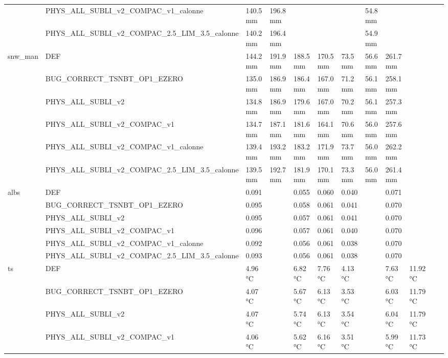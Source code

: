 \begin{tabular}{llllllllllll}
 & PHYS_ALL_SUBLI_v2_COMPAC_v1_calonne & 140.5 mm & 196.8 mm &  &  &  & 54.8 mm &  &  &  &  \\
 & PHYS_ALL_SUBLI_v2_COMPAC_2.5_LIM_3.5_calonne & 140.2 mm & 196.4 mm &  &  &  & 54.9 mm &  &  &  &  \\
\cline{1-12}
\multirow[t]{6}{*}{snw_man} & DEF & 144.2 mm & 191.9 mm & 188.5 mm & 170.5 mm & 73.5 mm & 56.6 mm & 261.7 mm &  &  &  \\
 & BUG_CORRECT_TSNBT_OP1_EZERO & 135.0 mm & 186.9 mm & 186.4 mm & 167.0 mm & 71.2 mm & 56.1 mm & 258.1 mm &  &  &  \\
 & PHYS_ALL_SUBLI_v2 & 134.8 mm & 186.9 mm & 179.6 mm & 167.0 mm & 70.2 mm & 56.1 mm & 257.3 mm &  &  &  \\
 & PHYS_ALL_SUBLI_v2_COMPAC_v1 & 134.7 mm & 187.1 mm & 181.6 mm & 164.1 mm & 70.6 mm & 56.0 mm & 257.6 mm &  &  &  \\
 & PHYS_ALL_SUBLI_v2_COMPAC_v1_calonne & 139.4 mm & 193.2 mm & 183.2 mm & 171.9 mm & 73.7 mm & 56.0 mm & 262.2 mm &  &  &  \\
 & PHYS_ALL_SUBLI_v2_COMPAC_2.5_LIM_3.5_calonne & 139.5 mm & 192.7 mm & 181.9 mm & 170.1 mm & 73.3 mm & 56.0 mm & 261.4 mm &  &  &  \\
\cline{1-12}
\multirow[t]{6}{*}{albs} & DEF & 0.091 &  & 0.055 & 0.060 & 0.040 &  & 0.071 &  &  &  \\
 & BUG_CORRECT_TSNBT_OP1_EZERO & 0.095 &  & 0.058 & 0.061 & 0.041 &  & 0.070 &  &  &  \\
 & PHYS_ALL_SUBLI_v2 & 0.095 &  & 0.057 & 0.061 & 0.041 &  & 0.070 &  &  &  \\
 & PHYS_ALL_SUBLI_v2_COMPAC_v1 & 0.096 &  & 0.057 & 0.061 & 0.040 &  & 0.070 &  &  &  \\
 & PHYS_ALL_SUBLI_v2_COMPAC_v1_calonne & 0.092 &  & 0.056 & 0.061 & 0.038 &  & 0.070 &  &  &  \\
 & PHYS_ALL_SUBLI_v2_COMPAC_2.5_LIM_3.5_calonne & 0.093 &  & 0.056 & 0.061 & 0.038 &  & 0.070 &  &  &  \\
\cline{1-12}
\multirow[t]{6}{*}{ts} & DEF & 4.96 °C &  & 6.82 °C & 7.76 °C & 4.13 °C &  & 7.63 °C & 11.92 °C &  &  \\
 & BUG_CORRECT_TSNBT_OP1_EZERO & 4.07 °C &  & 5.67 °C & 6.13 °C & 3.53 °C &  & 6.03 °C & 11.79 °C &  &  \\
 & PHYS_ALL_SUBLI_v2 & 4.07 °C &  & 5.74 °C & 6.13 °C & 3.54 °C &  & 6.04 °C & 11.79 °C &  &  \\
 & PHYS_ALL_SUBLI_v2_COMPAC_v1 & 4.06 °C &  & 5.62 °C & 6.16 °C & 3.51 °C &  & 5.99 °C & 11.73 °C &  &  \\

\end{tabular}
